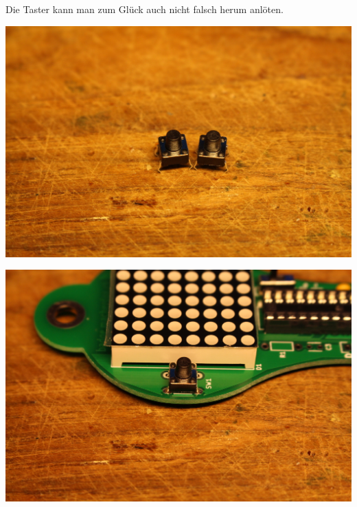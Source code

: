 \documentclass{article}
\begin{document}
Die Taster kann man zum Glück auch nicht falsch herum anlöten.

\vspace{1cm}

\begin{minipage}[b]{0.5\textwidth}
	\includegraphics[width=\textwidth]{Bilder2021/IMG_8157.JPG}
\end{minipage}
\begin{minipage}[b]{0.5\textwidth}
	\includegraphics[width=\textwidth]{Bilder2021/IMG_8158.JPG}
\end{minipage}

\vspace{0.5cm}
\end{document}
